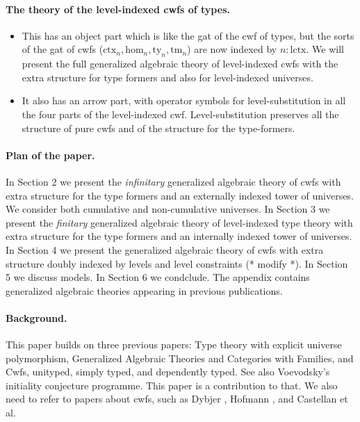 \documentclass[11pt,a4paper]{article}
\theoremstyle{definition}
\newcommand{\Ctx}{\mathrm{Ctx}}
\newcommand{\Ty}{\mathrm{Ty}}
\newcommand{\Tm}{\mathrm{Tm}}
\def\Ctx{\mathrm{ctx}}
\def\Ty{\mathrm{ty}}
\def\Tm{\mathrm{tm}}
\def\Hom{\mathrm{hom}}
\def\lctx{\mathrm{lctx}}
\begin{document}
\paragraph{The theory of the level-indexed cwfs of types.} 
\begin{itemize}
\item This has an object part which is like the gat of the cwf of types, but the sorts of the gat of cwfs ($\Ctx_n,\Hom_n,\Ty_n,\Tm_n$) are now indexed by $n : \lctx$. We will present the full generalized algebraic theory of level-indexed cwfs with the extra structure for type formers and also for  level-indexed universes.
\item It also has an arrow part, with operator symbols for level-substitution in all the four parts of the level-indexed cwf. Level-substitution preserves all the structure of pure cwfs and of the structure for the type-formers.
\end{itemize}

\paragraph{Plan of the paper.} In Section 2 we present the {\em infinitary} generalized algebraic theory of cwfs with extra structure for the type formers and an externally indexed tower of universes. We consider both cumulative and non-cumulative universes. In Section 3 we present the {\em finitary} generalized algebraic theory of level-indexed type theory with extra structure for the type formers and an internally indexed tower of universes. In Section 4 we present the generalized algebraic theory of cwfs with extra structure doubly indexed by levels and level constraints (* modify *). In Section 5 we discuss models. In Section 6 we condclude. The appendix contains generalized algebraic theories appearing in previous publications. 

\paragraph{Background.} This paper builds on three previous papers: Type theory with explicit universe polymorphism, Generalized Algebraic Theories and Categories with Families, and Cwfs, unityped, simply typed, and dependently typed. See also Voevodsky's initiality conjecture programme. This paper is a contribution to that. We also need to refer to papers about cwfs, such as Dybjer \cite{dybjer:torino}, Hofmann \cite{hofmann:cambridge}, and Castellan et al. 
\end{document}
